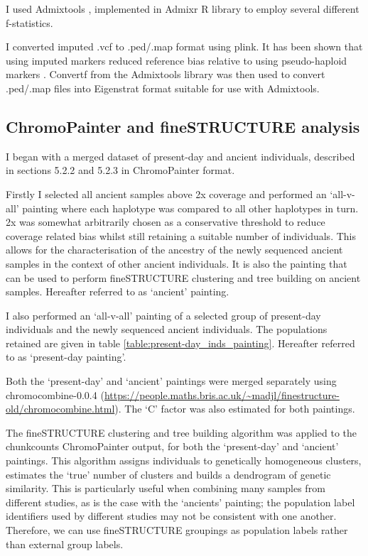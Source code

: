 I used Admixtools \cite{Patterson2012}, implemented in Admixr R library \cite{admixrpetr2019} to employ several different f-statistics. 

I converted imputed .vcf to .ped/.map format using plink. It has been shown that using imputed markers reduced reference bias relative to using pseudo-haploid markers \cite{Martiniano2017}. Convertf from the Admixtools library was then used to convert .ped/.map files into Eigenstrat format suitable for use with Admixtools. 

\subsection{ChromoPainter and fineSTRUCTURE analysis}

I began with a merged dataset of present-day and ancient individuals, described in sections 5.2.2 and 5.2.3 in ChromoPainter format. 

Firstly I selected all ancient samples above 2x coverage and performed an `all-v-all' painting where each haplotype was compared to all other haplotypes in turn. 2x was somewhat arbitrarily chosen as a conservative threshold to reduce coverage related bias whilst still retaining a suitable number of individuals. This allows for the characterisation of the ancestry of the newly sequenced ancient samples in the context of other ancient individuals. It is also the painting that can be used to perform fineSTRUCTURE clustering and tree building on ancient samples. Hereafter referred to as `ancient' painting.

I also performed an `all-v-all' painting of a selected group of present-day individuals and the newly sequenced ancient individuals. The populations retained are given in table \ref{table:present-day_inds_painting}. Hereafter referred to as `present-day painting'.

Both the `present-day' and `ancient' paintings were merged separately using chromocombine-0.0.4 (\url{https://people.maths.bris.ac.uk/~madjl/finestructure-old/chromocombine.html}). The `C' factor was also estimated for both paintings. 

The fineSTRUCTURE \cite{Lawson2012} clustering and tree building algorithm was applied to the chunkcounts ChromoPainter output, for both the `present-day' and `ancient' paintings. This algorithm assigns individuals to genetically homogeneous clusters, estimates the `true' number of clusters and builds a dendrogram of genetic similarity. This is particularly useful when combining many samples from different studies, as is the case with the `ancients' painting; the population label identifiers used by different studies may not be consistent with one another. Therefore, we can use fineSTRUCTURE groupings as population labels rather than external group labels. 


